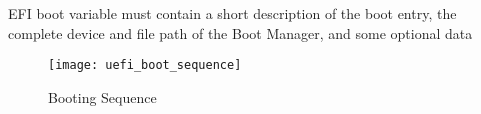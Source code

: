 EFI boot variable must contain a short description of the boot entry, the complete
device and file path of the Boot Manager, and some optional data
\cite{windows-internals-7-part2}

\begin{figure}[htb]%
    \centering%
    \texttt{[image: uefi\_boot\_sequence]}%
    \caption{Booting Sequence \cite[Figure 2-1]{uefi-spec}}%
    \label{fig:uefi-boot-sequence}%
\end{figure}